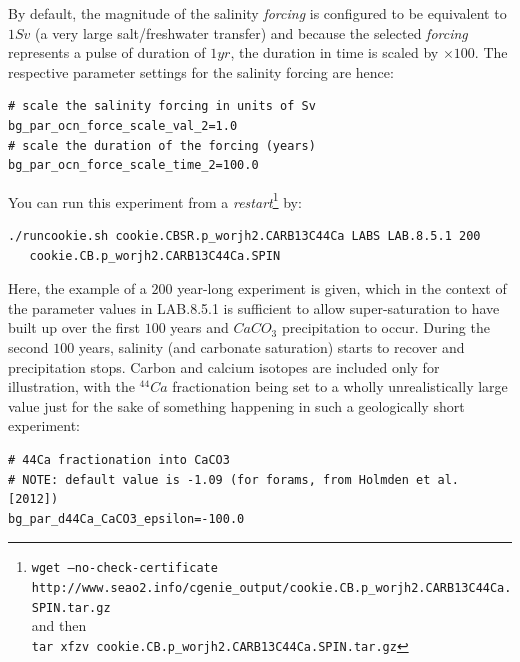 By default, the magnitude of the salinity \textit{forcing} is configured to be equivalent to $1 Sv$ (a very large salt/freshwater transfer) and because the selected \textit{forcing} represents a pulse of duration of $1 yr$, the duration in time is scaled by $\times 100$. The respective parameter settings for the salinity forcing are hence:

\vspace{-2mm}\small\begin{verbatim}
# scale the salinity forcing in units of Sv
bg_par_ocn_force_scale_val_2=1.0
# scale the duration of the forcing (years)
bg_par_ocn_force_scale_time_2=100.0
\end{verbatim}\normalsize\vspace{-2mm}

\newpage

\noindent You can run this experiment from a \textit{restart}\footnote{\texttt{wget --no-check-certificate \\http://www.seao2.info/cgenie\_output/cookie.CB.p\_worjh2.CARB13C44Ca.SPIN.tar.gz} \\and then \\\texttt{tar xfzv cookie.CB.p\_worjh2.CARB13C44Ca.SPIN.tar.gz}} by:

\vspace{-1mm}\small\begin{verbatim}
./runcookie.sh cookie.CBSR.p_worjh2.CARB13C44Ca LABS LAB.8.5.1 200 
   cookie.CB.p_worjh2.CARB13C44Ca.SPIN
\end{verbatim}\normalsize\vspace{-1mm}

Here, the example of a $200$ year-long experiment is given, which in the context of the parameter values in \textsf{\footnotesize LAB.8.5.1} is sufficient to allow super-saturation to have built up over the first $100$ years and $CaCO_{3}$ precipitation to occur. During the second $100$ years, salinity (and carbonate saturation) starts to recover and precipitation stops.  Carbon and calcium isotopes are included only for illustration, with the $^{44}Ca$ fractionation being set to a wholly unrealistically large value just for the sake of something happening in such a geologically short experiment:

\vspace{-1mm}\small\begin{verbatim}
# 44Ca fractionation into CaCO3
# NOTE: default value is -1.09 (for forams, from Holmden et al. [2012])
bg_par_d44Ca_CaCO3_epsilon=-100.0
\end{verbatim}\normalsize\vspace{-1mm}


